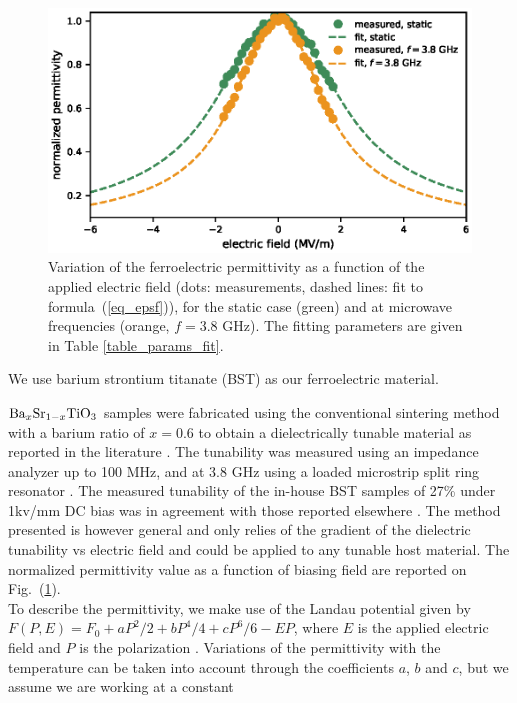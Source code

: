 \documentclass[%
 aip,
 amsmath,amssymb,
 reprint,%
]{revtex4-1}
\newcommand{\fig}[1]{Fig.~(\ref{#1})}
\newcommand{\co}[1]{#1}
\begin{document}
\begin{figure}[!t]
 \centering
 \includegraphics[width=1\columnwidth]{epsilon_fit}
 \caption{Variation of the ferroelectric permittivity as a function of the
  applied electric field (dots: measurements, dashed lines: fit to
  formula~(\ref{eq_epsf})), for the static case (green) and at microwave frequencies
  (orange, $f=3.8$ GHz). The fitting parameters are given in Table \ref{table_params_fit}.}
 \label{fig1}
\end{figure}
We use barium strontium titanate (BST) as our ferroelectric material.
\co{
${\rm Ba}_{x}{\rm Sr}_{1-x}{\rm TiO}_3$ samples were fabricated using the conventional sintering method with a barium ratio of $x = 0.6$ to obtain a dielectrically tunable material as reported in the literature \cite{agrawal_tunable_2004, hu_preparation_2015}. The tunability was measured using an impedance analyzer up to 100 MHz, and at 3.8 GHz using a loaded microstrip split ring resonator \cite{ansari_design_2015}. The measured tunability of the in-house BST samples of 27\% under 1kv/mm DC bias was in agreement with those reported elsewhere \cite{agrawal_tunable_2004, hu_preparation_2015}. The method presented is however general and only relies of the gradient of the dielectric tunability vs electric field and could be applied to any tunable host material.
The normalized permittivity value
as a function of biasing field are reported on \fig{fig1}.\\}
To describe the permittivity, we make use of the Landau potential
given by $F(P,E) = F_0 +  a P^2/2 + b P^4/4 + cP^6/6 - EP$, where $E$ is
the applied electric field and $P$ is the polarization \cite{landau_electrodynamics_2013, zhou_dielectric_2008}. Variations of the
permittivity with the temperature can be taken into account through the
coefficients $a$, $b$ and $c$, but we assume we are working at a constant
\end{document}
